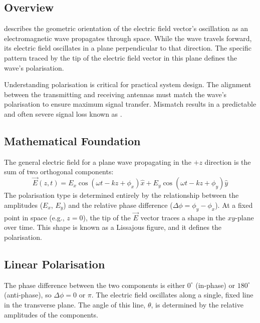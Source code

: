 \subsection{Overview}

 describes the geometric orientation of the electric field vector's oscillation as an electromagnetic wave propagates through space. While the wave travels forward, its electric field oscillates in a plane perpendicular to that direction. The specific pattern traced by the tip of the electric field vector in this plane defines the wave's polarisation.

\begin{keyconcept}
    Understanding polarisation is critical for practical system design. The alignment between the transmitting and receiving antennas must match the wave's polarisation to ensure maximum signal transfer. Mismatch results in a predictable and often severe signal loss known as .
\end{keyconcept}


\subsection{Mathematical Foundation}

The general electric field for a plane wave propagating in the $+z$ direction is the sum of two orthogonal components:
\begin{equation}
    \vec{E}(z,t) = E_x \cos(\omega t - kz + \phi_x)\hat{x} + E_y \cos(\omega t - kz + \phi_y)\hat{y}
    \label{eq:general-efield}
\end{equation}
The polarisation type is determined entirely by the relationship between the amplitudes ($E_x$, $E_y$) and the relative phase difference ($\Delta\phi = \phi_y - \phi_x$). At a fixed point in space (e.g., $z=0$), the tip of the $\vec{E}$ vector traces a shape in the $xy$-plane over time. This shape is known as a Lissajous figure, and it defines the polarisation.


\subsection{Linear Polarisation}

 The phase difference between the two components is either $0^\circ$ (in-phase) or $180^\circ$ (anti-phase), so $\Delta\phi = 0$ or $\pi$.
 The electric field oscillates along a single, fixed line in the transverse plane. The angle of this line, $\theta$, is determined by the relative amplitudes of the components.

